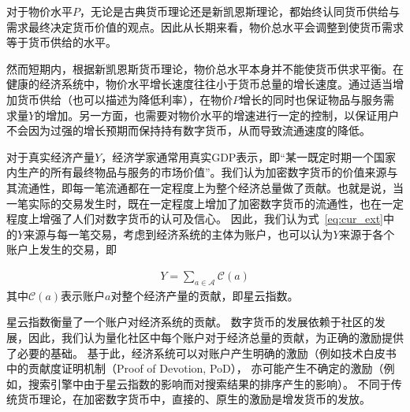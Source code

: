 
对于物价水平$P$，无论是古典货币理论还是新凯恩斯理论，都始终认同货币供给与需求最终决定货币价值的观点。因此从长期来看，物价总水平会调整到使货币需求等于货币供给的水平。

然而短期内，根据新凯恩斯货币理论，物价总水平本身并不能使货币供求平衡。在健康的经济系统中，物价水平增长速度往往小于货币总量的增长速度。通过适当增加货币供给（也可以描述为降低利率），在物价$P$增长的同时也保证物品与服务需求量$Y$的增加。另一方面，也需要对物价水平的增速进行一定的控制，以保证用户不会因为过强的增长预期而保持持有数字货币，从而导致流通速度的降低。




对于真实经济产量$Y$，经济学家通常用真实GDP表示，即“某一既定时期一个国家内生产的所有最终物品与服务的市场价值”。我们认为加密数字货币的价值来源与其流通性，即每一笔流通都在一定程度上为整个经济总量做了贡献。也就是说，当一笔实际的交易发生时，既在一定程度上增加了加密数字货币的流通性，也在一定程度上增强了人们对数字货币的认可及信心。
因此，我们认为式~\ref{eq:cur_ext}中的$Y$来源与每一笔交易，考虑到经济系统的主体为账户，也可以认为$Y$来源于各个账户上发生的交易，即

\begin{align}
Y=\sum_{a\in \mathcal{A}} \mathcal{C}(a)
\end{align}
\noindent 其中$\mathcal{C}(a)$表示账户$a$对整个经济产量的贡献，即星云指数。

星云指数衡量了一个账户对经济系统的贡献。
数字货币的发展依赖于社区的发展，因此，我们认为量化社区中每个账户对于经济总量的贡献，为正确的激励提供了必要的基础。
基于此，经济系统可以对账户产生明确的激励（例如技术白皮书中的贡献度证明机制（Proof of Devotion, PoD），
亦可能产生不确定的激励（例如，搜索引擎中由于星云指数的影响而对搜索结果的排序产生的影响）。
不同于传统货币理论，在加密数字货币中，直接的、原生的激励是增发货币的发放。




